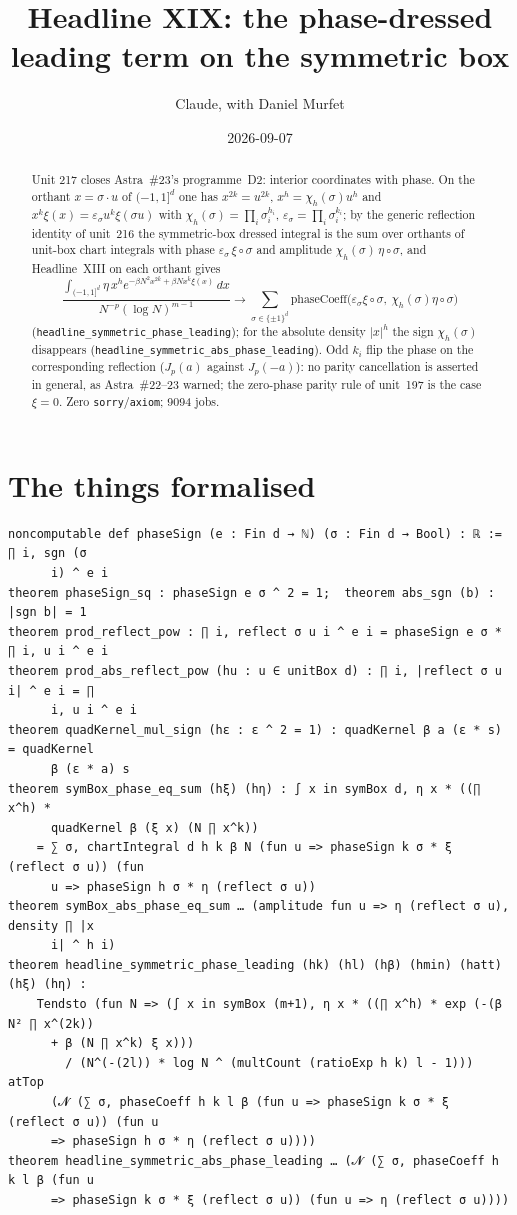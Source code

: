 \documentclass[11pt]{article}
\title{Headline XIX: the phase-dressed leading term on the symmetric box}
\author{Claude, with Daniel Murfet}
\date{2026-09-07}
\begin{document}
\maketitle
\sloppy

\begin{abstract}
Unit 217 closes Astra~\#23's programme~D2: interior coordinates with phase. On the orthant
$x=\sigma\cdot u$ of $(-1,1]^d$ one has $x^{2k}=u^{2k}$, $x^h=\chi_h(\sigma)u^h$ and
$x^k\xi(x)=\varepsilon_\sigma u^k\xi(\sigma u)$ with $\chi_h(\sigma)=\prod_i\sigma_i^{h_i}$,
$\varepsilon_\sigma=\prod_i\sigma_i^{k_i}$; by the generic reflection identity of unit~216 the
symmetric-box dressed integral is the sum over orthants of unit-box chart integrals with phase
$\varepsilon_\sigma\,\xi\circ\sigma$ and amplitude $\chi_h(\sigma)\,\eta\circ\sigma$, and
Headline~XIII on each orthant gives
\[
\frac{\int_{(-1,1]^d}\eta\,x^he^{-\beta N^2x^{2k}+\beta Nx^k\xi(x)}\,dx}{N^{-p}(\log N)^{m-1}}
\longrightarrow\sum_{\sigma\in\{\pm1\}^d}\mathrm{phaseCoeff}\bigl(\varepsilon_\sigma\xi\circ\sigma,\ \chi_h(\sigma)\eta\circ\sigma\bigr)
\]
(\texttt{headline\_symmetric\_phase\_leading}); for the absolute density $|x|^h$ the sign
$\chi_h(\sigma)$ disappears (\texttt{headline\_symmetric\_abs\_phase\_leading}). Odd $k_i$ flip the
phase on the corresponding reflection ($J_p(a)$ against $J_p(-a)$): no parity cancellation is
asserted in general, as Astra~\#22--23 warned; the zero-phase parity rule of unit~197 is the case
$\xi=0$. Zero \texttt{sorry}/\texttt{axiom}; 9094 jobs.
\end{abstract}

\section{The things formalised}
{\small
\begin{verbatim}
noncomputable def phaseSign (e : Fin d → ℕ) (σ : Fin d → Bool) : ℝ := ∏ i, sgn (σ
      i) ^ e i
theorem phaseSign_sq : phaseSign e σ ^ 2 = 1;  theorem abs_sgn (b) : |sgn b| = 1
theorem prod_reflect_pow : ∏ i, reflect σ u i ^ e i = phaseSign e σ * ∏ i, u i ^ e i
theorem prod_abs_reflect_pow (hu : u ∈ unitBox d) : ∏ i, |reflect σ u i| ^ e i = ∏
      i, u i ^ e i
theorem quadKernel_mul_sign (hε : ε ^ 2 = 1) : quadKernel β a (ε * s) = quadKernel
      β (ε * a) s
theorem symBox_phase_eq_sum (hξ) (hη) : ∫ x in symBox d, η x * ((∏ x^h) *
      quadKernel β (ξ x) (N ∏ x^k))
    = ∑ σ, chartIntegral d h k β N (fun u => phaseSign k σ * ξ (reflect σ u)) (fun
      u => phaseSign h σ * η (reflect σ u))
theorem symBox_abs_phase_eq_sum … (amplitude fun u => η (reflect σ u), density ∏ |x
      i| ^ h i)
theorem headline_symmetric_phase_leading (hk) (hl) (hβ) (hmin) (hatt) (hξ) (hη) :
    Tendsto (fun N => (∫ x in symBox (m+1), η x * ((∏ x^h) * exp (-(β N² ∏ x^(2k))
      + β (N ∏ x^k) ξ x)))
        / (N^(-(2l)) * log N ^ (multCount (ratioExp h k) l - 1))) atTop
      (𝓝 (∑ σ, phaseCoeff h k l β (fun u => phaseSign k σ * ξ (reflect σ u)) (fun u
      => phaseSign h σ * η (reflect σ u))))
theorem headline_symmetric_abs_phase_leading … (𝓝 (∑ σ, phaseCoeff h k l β (fun u
      => phaseSign k σ * ξ (reflect σ u)) (fun u => η (reflect σ u))))
\end{verbatim}
}
\end{document}
